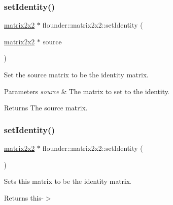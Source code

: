 \subsubsection{\texorpdfstring{set\+Identity()}{setIdentity()}\hspace{0.1cm}{\footnotesize\ttfamily [1/2]}}
{\footnotesize\ttfamily \hyperlink{classflounder_1_1matrix2x2}{matrix2x2} $\ast$ flounder\+::matrix2x2\+::set\+Identity (\begin{DoxyParamCaption}\item[{\hyperlink{classflounder_1_1matrix2x2}{matrix2x2} $\ast$}]{source }\end{DoxyParamCaption})\hspace{0.3cm}{\ttfamily [static]}}



Set the source matrix to be the identity matrix. 


\begin{DoxyParams}{Parameters}
{\em source} & The matrix to set to the identity. \\
\hline
\end{DoxyParams}
\begin{DoxyReturn}{Returns}
The source matrix. 
\end{DoxyReturn}
\mbox{\label{classflounder_1_1matrix2x2_ab2faeb82835ac1637fbf27f78df70443}} 
\subsubsection{\texorpdfstring{set\+Identity()}{setIdentity()}\hspace{0.1cm}{\footnotesize\ttfamily [2/2]}}
{\footnotesize\ttfamily \hyperlink{classflounder_1_1matrix2x2}{matrix2x2} $\ast$ flounder\+::matrix2x2\+::set\+Identity (\begin{DoxyParamCaption}{ }\end{DoxyParamCaption})}



Sets this matrix to be the identity matrix. 

\begin{DoxyReturn}{Returns}
this-\/$>$ 
\end{DoxyReturn}
\mbox{\label{classflounder_1_1matrix2x2_af3c4426514b430d36cd8c79e029d53ed}} 
